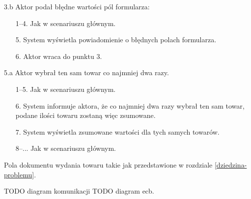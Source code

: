 \begin{usecase}
{\begin{enumerate}
      \end{enumerate}
    \item [3.b] Aktor podał błędne wartości pól formularza:
      \begin{enumerate}
        \item[1--4.] Jak w scenariuszu głównym.
        \item[5.] System wyświetla powiadomienie o błędnych polach formularza.
        \item[6.] Aktor wraca do punktu 3.
      \end{enumerate}
     \item[5.a] Aktor wybrał ten sam towar co najmniej dwa razy.
       \begin{enumerate}
       \item[1--5.] Jak w scenariuszu głównym.
       \item[6.] System informuje aktora, że co najmniej dwa razy wybrał ten sam towar, podane ilości towaru zostaną więc zsumowane.
       \item[7.] System wyświetla zsumowane wartości dla tych samych towarów.
       \item[8--...] Jak w scenariuszu głównym.
       \end{enumerate}
  }
   {
    Pola dokumentu wydania towaru takie jak przedstawione w rozdziale \ref{dziedzina-problemu}.
  }
\end{usecase}
TODO diagram komunikacji
TODO diagram ecb.
